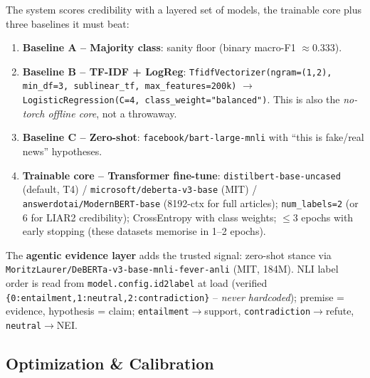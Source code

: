 \documentclass[12pt,a4paper]{article}
\begin{document}
The system scores credibility with a layered set of models, the trainable core plus three baselines it must beat:
\begin{enumerate}
  \item \textbf{Baseline A -- Majority class}: sanity floor (binary macro-F1 $\approx 0.333$).
  \item \textbf{Baseline B -- TF-IDF + LogReg}: \texttt{TfidfVectorizer(ngram=(1,2), min\_df=3, sublinear\_tf, max\_features=200k)} $\rightarrow$ \texttt{LogisticRegression(C=4, class\_weight="balanced")}. This is also the \emph{no-torch offline core}, not a throwaway.
  \item \textbf{Baseline C -- Zero-shot}: \texttt{facebook/bart-large-mnli} with ``this is fake/real news'' hypotheses.
  \item \textbf{Trainable core -- Transformer fine-tune}: \texttt{distilbert-base-uncased} (default, T4) / \texttt{microsoft/deberta-v3-base} (MIT) / \texttt{answerdotai/ModernBERT-base} (8192-ctx for full articles); \texttt{num\_labels=2} (or 6 for LIAR2 credibility); CrossEntropy with class weights; $\leq 3$ epochs with early stopping (these datasets memorise in 1--2 epochs).
\end{enumerate}

\noindent The \textbf{agentic evidence layer} adds the trusted signal: zero-shot stance via \texttt{MoritzLaurer/DeBERTa-v3-base-mnli-fever-anli} (MIT, 184M). NLI label order is read from \texttt{model.config.id2label} at load (verified \texttt{\{0:entailment,1:neutral,2:contradiction\}} -- \emph{never hardcoded}); premise = evidence, hypothesis = claim; \texttt{entailment}$\rightarrow$support, \texttt{contradiction}$\rightarrow$refute, \texttt{neutral}$\rightarrow$NEI.

\subsection{Optimization \& Calibration}
\end{document}
